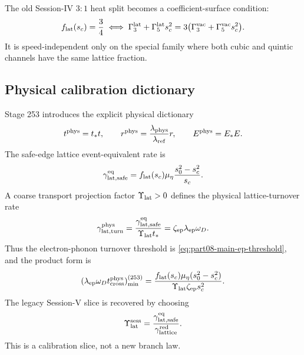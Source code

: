 The old Session-IV \(3:1\) heat split becomes a coefficient-surface condition:
\begin{equation}
\label{eq:part08-stage252-three-one-surface}
f_{\rm lat}(s_c)=\frac34
\iff
\Gamma_3^{\rm lat}+\Gamma_5^{\rm lat}s_c^2
=
3\bigl(\Gamma_3^{\rm vac}+\Gamma_5^{\rm vac}s_c^2\bigr).
\end{equation}
It is speed-independent only on the special family where both cubic and quintic channels have the same lattice fraction.

\subsection{Physical calibration dictionary}
\label{subsec:part08-stage253-calibration}

Stage 253 introduces the explicit physical dictionary
\begin{equation}
\label{eq:part08-stage253-physical-dictionary}
t^{\rm phys}=t_*t,
\qquad
r^{\rm phys}=\frac{\lambda_{\rm phys}}{\lambda_{\rm ref}}r,
\qquad
E^{\rm phys}=E_*E.
\end{equation}
The safe-edge lattice event-equivalent rate is
\begin{equation}
\label{eq:part08-stage253-lat-safe-rate}
\gamma_{\rm lat,safe}^{\rm eq}
=
f_{\rm lat}(s_c)\mu_\eta\frac{s_0^2-s_c^2}{s_c}.
\end{equation}
A coarse transport projection factor \(\Upsilon_{\rm lat}>0\) defines the physical lattice-turnover rate
\begin{equation}
\label{eq:part08-stage253-lattice-turn-rate}
\gamma_{\rm lat,turn}^{\rm phys}
=
\frac{\gamma_{\rm lat,safe}^{\rm eq}}{\Upsilon_{\rm lat}t_*}
=
\zeta_{\rm ep}\lambda_{\rm ep}\omega_D.
\end{equation}
Thus the electron-phonon turnover threshold is \cref{eq:part08-main-ep-threshold}, and the product form is
\begin{equation}
\label{eq:part08-stage253-ep-product}
(\lambda_{\rm ep}\omega_Dt_{\rm cross}^{\rm phys})_{\min}^{(253)}
=
\frac{f_{\rm lat}(s_c)\mu_\eta(s_0^2-s_c^2)}{\Upsilon_{\rm lat}\zeta_{\rm ep}s_c^2}.
\end{equation}
The legacy Session-V slice is recovered by choosing
\begin{equation}
\label{eq:part08-stage253-upsilon-session}
\Upsilon_{\rm lat}^{\rm sess}
=
\frac{\gamma_{\rm lat,safe}^{\rm eq}}{\gamma_{\rm lattice}^{\rm red}}.
\end{equation}
This is a calibration slice, not a new branch law.

